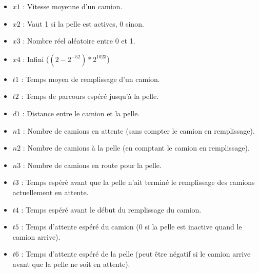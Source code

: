\documentclass[letterpaper,12pt]{article}
\begin{document}
	
	\begin{itemize}
		\setlength\itemsep{0.01em}
		\item $x1$ : Vitesse moyenne d'un camion.
		\item $x2$ : Vaut 1 si la pelle est actives, 0 sinon.
		\item $x3$ : Nombre réel aléatoire entre 0 et 1.
		\item $x4$ : Infini ($(2-2^{-52})*2^{1023}$)
		\item $t1$ : Temps moyen de remplissage d'un camion.
		\item $t2$ : Temps de parcours espéré jusqu'à la pelle.  
		\item $d1$ : Distance entre le camion et la pelle.
		\item $n1$ : Nombre de camions en attente (sans compter le camion en remplissage).
		\item $n2$ : Nombre de camions à la pelle (en comptant le camion en remplissage).
		\item $n3$ : Nombre de camions en route pour la pelle.
		\item $t3$ : Temps espéré avant que la pelle n'ait terminé le remplissage des camions actuellement en attente.
		\item $t4$ : Temps espéré avant le début du remplissage du camion.
		\item $t5$ : Temps d'attente espéré du camion (0 si la pelle est inactive quand le camion arrive).
		\item $t6$ : Temps d'attente espéré de la pelle (peut être négatif si le camion arrive avant que la pelle ne soit en attente).
	\end{itemize}
	
	
	
\end{document}
